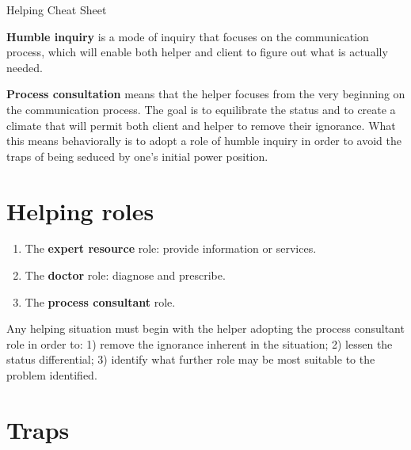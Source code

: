 \documentclass{article}
\newenvironment{nosepenumerate}
{ \begin{enumerate}
    \setlength{\itemsep}{0pt}
    \setlength{\parskip}{0pt}
    \setlength{\parsep}{0pt}     }
{ \end{enumerate}                  }
\begin{document}
\begin{center}
     \Large{{Helping Cheat Sheet}}
\end{center}

\begin{multicols}{2}

\noindent
\textbf{Humble inquiry} is a mode of inquiry that focuses on the communication process, which will enable both helper and client to figure out what is actually needed.

\textbf{Process consultation} means that the helper focuses from the very beginning on the communication process. The goal is to equilibrate the status and to create a climate that will permit both client and helper to remove their ignorance. What this means behaviorally is to adopt a role of humble inquiry in order to avoid the traps of being seduced by one's initial power position.

\end{multicols}

\section{Helping roles}

\begin{nosepenumerate}
    \item The \textbf{expert resource} role: provide information or services.
    \item The \textbf{doctor} role: diagnose and prescribe.
    \item The \textbf{process consultant} role.
\end{nosepenumerate}

\noindent
Any helping situation must begin with the helper adopting the process consultant role in order to: 1) remove the ignorance inherent in the situation; 2) lessen the status differential; 3) identify what further role may be most suitable to the problem identified.

\section{Traps}
\end{document}
